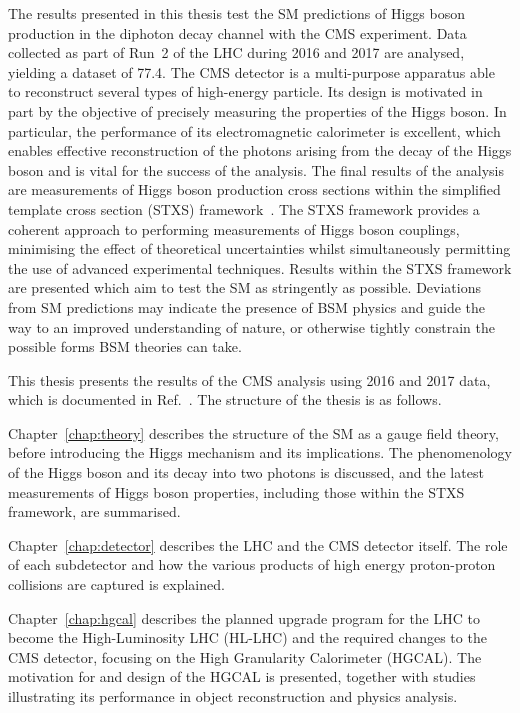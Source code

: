 The results presented in this thesis test the SM predictions of Higgs boson production
in the diphoton decay channel with the CMS experiment.
Data collected as part of Run~2 of the LHC during 2016 and 2017 are analysed, 
yielding a dataset of \SI{77.4}{\fbinv}.
The CMS detector is a multi-purpose apparatus able to reconstruct several types of high-energy particle.
Its design is motivated in part by the objective of precisely measuring the properties of the Higgs boson.
In particular, the performance of its electromagnetic calorimeter is excellent, 
which enables effective reconstruction of the photons arising from the decay of the Higgs boson
and is vital for the success of the \Hgg analysis.
The final results of the analysis are measurements of Higgs boson production cross sections
within the simplified template cross section (STXS) framework~\cite{YR4}.
The STXS framework provides a coherent approach to performing measurements of Higgs boson couplings, 
minimising the effect of theoretical uncertainties 
whilst simultaneously permitting the use of advanced experimental techniques.
Results within the STXS framework are presented
which aim to test the SM as stringently as possible.
Deviations from SM predictions may indicate the presence of BSM physics 
and guide the way to an improved understanding of nature, 
or otherwise tightly constrain the possible forms BSM theories can take.

This thesis presents the results of the CMS \Hgg analysis using 2016 and 2017 data, 
which is documented in Ref.~\cite{HIG-18-029}.
The structure of the thesis is as follows.

Chapter~\ref{chap:theory} describes the structure of the SM as a gauge field theory, 
before introducing the Higgs mechanism and its implications.
The phenomenology of the Higgs boson and its decay into two photons is discussed, 
and the latest measurements of Higgs boson properties, including those within the STXS framework, 
are summarised.

Chapter~\ref{chap:detector} describes the LHC and the CMS detector itself.
The role of each subdetector and how the various products 
of high energy proton-proton collisions are captured is explained.

Chapter~\ref{chap:hgcal} describes the planned upgrade program for the LHC to become the High-Luminosity LHC (HL-LHC) 
and the required changes to the CMS detector, focusing on the High Granularity Calorimeter (HGCAL).
The motivation for and design of the HGCAL is presented, 
together with studies illustrating its performance in object reconstruction and physics analysis.

